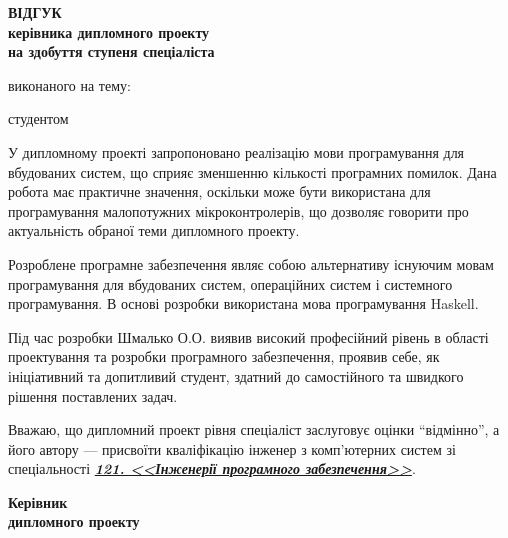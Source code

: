 \documentclass[main.tex]{subfiles}
\begin{document}
\begin{otherspecialpage}
  \begin{singlespacing}
  \begin{center}
    \textbf{
      {\large ВІДГУК}\\
      керівника дипломного проекту\\
      на здобуття ступеня спеціаліста
    }\\
  \end{center}

  \noindent виконаного на тему: \fillin{\thesistitle\hfill\mbox{}}

  \noindent студентом \fillinline{}\\\vspace{5mm}
  \end{singlespacing}

  У дипломному проекті запропоновано реалізацію мови програмування для вбудованих систем, що сприяє зменшенню кількості програмних помилок. Дана робота має практичне значення, оскільки може бути використана для програмування малопотужних мікроконтролерів, що дозволяє говорити про актуальність обраної теми дипломного проекту.

  Розроблене програмне забезпечення являє собою альтернативу існуючим мовам програмування для вбудованих систем, операційних систем і системного програмування. В основі розробки використана мова програмування Haskell.

  Під час розробки Шмалько О.О. виявив високий професійний рівень в області проектування та розробки програмного забезпечення, проявив себе, як ініціативний та допитливий студент, здатний до самостійного та швидкого рішення поставлених задач.

  Вважаю, що дипломний проект рівня спеціаліст заслуговує оцінки ``відмінно'', а його автору --- присвоїти кваліфікацію інженер з комп'ютерних систем зі спеціальності \underline{\emph{\textbf{121. <<Інженерії програмного забезпечення>>}}}.\\

  \vfill

  \noindent
  \textbf{Керівник\\
    дипломного проекту}\\
  \hfill
  \fillin[(підпис)]{\hspace{22mm}}
  \hfill

  \vfill
\end{otherspecialpage}
\end{document}
